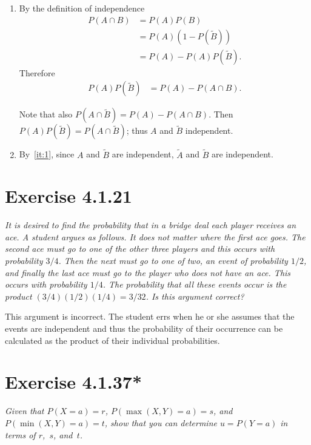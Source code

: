 \documentclass{abrice}
\begin{document}
\bigskip

\begin{enumerate}[label=(\alph*)]
\item\label{it:1} By the definition of independence
  \begin{align*}
    P(A \cap B)
    &= P(A)P(B)\\
    &= P(A)(1 - P(\tilde{B}))\\
    &= P(A) - P(A)P(\tilde{B}).
  \end{align*}
  Therefore
  \begin{align*}
    P(A)P(\tilde{B})
    &= P(A) - P(A \cap B).
  \end{align*}

  Note that also $P(A \cap \tilde{B}) = P(A) - P(A \cap B)$. Then
  $P(A)P(\tilde{B}) = P(A \cap \tilde{B})$; thus $A$ and $\tilde{B}$
  independent.

\item By~\ref{it:1}, since $A$ and $\tilde{B}$ are independent,
  $\tilde{A}$ and $\tilde{B}$ are independent.
\end{enumerate}

\section{Exercise 4.1.21}

\emph{It is desired to find the probability that in a bridge deal each player
receives an ace.  A student argues as follows.  It does not matter where the
first ace goes.  The second ace must go to one of the other three players and
this occurs with probability $3/4$.  Then the next must go to one of two, an
event of probability $1/2$, and finally the last ace must go to the player who
does not have an ace.  This occurs with probability $1/4$.  The probability that
all these events occur is the product $(3/4)(1/2)(1/4) = 3/32$.  Is this
argument correct?}

\bigskip

This argument is incorrect. The student errs when he or she assumes
that the events are independent and thus the probability of their
occurrence can be calculated as the product of their individual
probabilities.

\section{Exercise 4.1.37*}

\emph{Given that $P(X = a) = r$, $P(\max(X,Y) = a) = s$, and
  $P(\min(X,Y) = a) = t$, show that you can determine $u = P(Y = a)$
  in terms of $r$,~$s$, and~$t$.}
\end{document}
